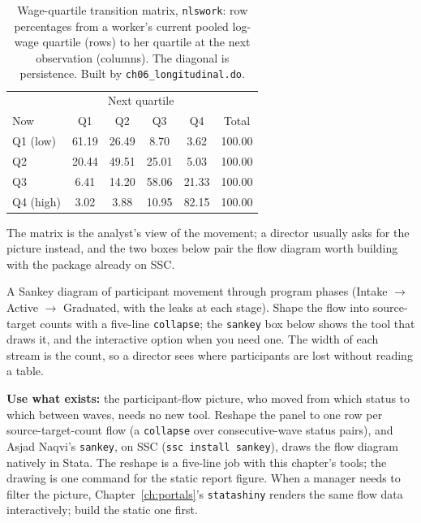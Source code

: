 \documentclass[
    a4paper,
    fontsize=10pt,
    twoside=true,
    numbers=noenddot,
]{kaobook}
\newenvironment{vizcallout}[1][Visualization to build]{%
    \begin{vizbox}[frametitle={#1}]%
}{%
    \end{vizbox}%
}
\begin{document}
\begin{table}[htbp]
\centering
\caption[Wage-quartile transition matrix]{Wage-quartile transition matrix, \texttt{nlswork}: row percentages from a worker's current pooled log-wage quartile (rows) to her quartile at the next observation (columns). The diagonal is persistence. Built by \texttt{ch06\_longitudinal.do}.}
\label{tab:transition}
{\footnotesize
\begin{tabular}{lccccc}
\hline
             & \multicolumn{4}{c}{Next quartile} &        \\
Now          & Q1     & Q2     & Q3     & Q4     & Total  \\
\hline
Q1 (low)     & 61.19  & 26.49  &  8.70  &  3.62  & 100.00 \\
Q2           & 20.44  & 49.51  & 25.01  &  5.03  & 100.00 \\
Q3           &  6.41  & 14.20  & 58.06  & 21.33  & 100.00 \\
Q4 (high)    &  3.02  &  3.88  & 10.95  & 82.15  & 100.00 \\
\hline
\end{tabular}
}
\end{table}

The matrix is the analyst's view of the movement; a director usually asks for the picture instead, and the two boxes below pair the flow diagram worth building with the package already on SSC.

\begin{vizcallout}[Visualization to build: the Sankey flow]
A Sankey diagram of participant movement through program phases (Intake $\rightarrow$ Active $\rightarrow$ Graduated, with the leaks at each stage). Shape the flow into source-target counts with a five-line \texttt{collapse}; the \texttt{sankey} box below shows the tool that draws it, and the interactive option when you need one. The width of each stream is the count, so a director sees where participants are lost without reading a table.
\end{vizcallout}

\begin{kaobox}[frametitle=Existing tool: \texttt{sankey} for participant-flow pictures]
\textbf{Use what exists:} the participant-flow picture, who moved from which status to which between waves, needs no new tool. Reshape the panel to one row per source-target-count flow (a \texttt{collapse} over consecutive-wave status pairs), and Asjad Naqvi's \texttt{sankey}, on SSC (\texttt{ssc install sankey}), draws the flow diagram natively in Stata. The reshape is a five-line job with this chapter's tools; the drawing is one command for the static report figure. When a manager needs to filter the picture, Chapter~\ref{ch:portals}'s \texttt{statashiny} renders the same flow data interactively; build the static one first.
\end{kaobox}
\end{document}
